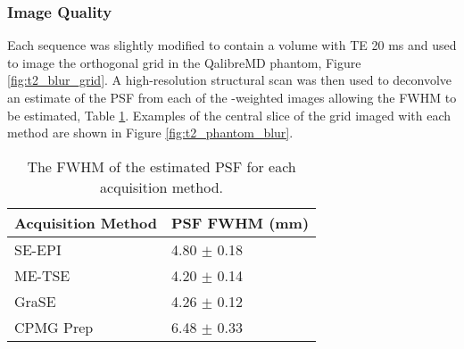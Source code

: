 \subsubsection{Image Quality}

Each sequence was slightly modified to contain a volume with TE 20 ms and used to image the orthogonal grid in the QalibreMD phantom, Figure \ref{fig:t2_blur_grid}. A high-resolution structural scan was then used to deconvolve an estimate of the \ac{PSF} from each of the \ttwo-weighted images allowing the \ac{FWHM} to be estimated, Table \ref{tab:t2_phantom_blur}. Examples of the central slice of the grid imaged with each method are shown in Figure \ref{fig:t2_phantom_blur}. 

\begin{table}[H]
	\centering
	\begin{tabular}{l|l}
		Acquisition   Method & PSF FWHM (mm)        \\ \hline
		SE-EPI               & 4.80   $\pm$ 0.18    \\ \hline
		ME-TSE               & 4.20 $\pm$ 0.14      \\ \hline
		GraSE                & 4.26   $\pm$ 0.12    \\ \hline
		CPMG   \ttwo Prep    & 6.48   $\pm$ 0.33                    
	\end{tabular}
	\caption{The \ac{FWHM} of the estimated \ac{PSF} for each acquisition method.}
	\label{tab:t2_phantom_blur}
\end{table}

